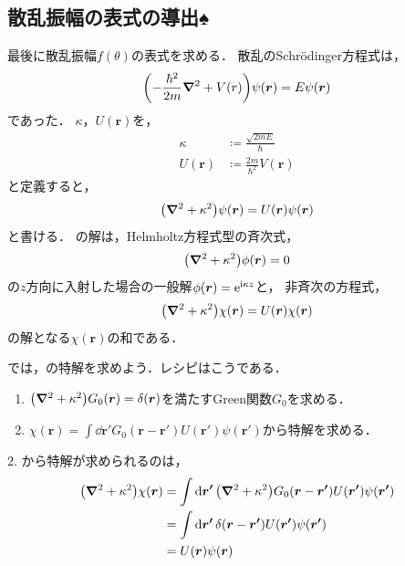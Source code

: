 \documentclass{report}
\begin{document}
  \subsection{散乱振幅の表式の導出♠}
    最後に散乱振幅$f(\theta)$の表式を求める．
    散乱のSchrödinger方程式は，
    \begin{align}
      \qty(-\frac{\hbar^2}{2m}\grad^2 + V(r))\psi(\bm{r}) = E\psi(\bm{r})
    \end{align}
    であった．
    $\kappa$，$U(\bm{r})$を，
    \begin{align}
      \kappa &\coloneqq \frac{\sqrt{2mE}}{\hbar} \label{kappa-def}\\
      U(\bm{r}) &\coloneqq \frac{2m}{\hbar^2} V(\bm{r})
    \end{align}
    と定義すると，
    \begin{align}
      \qty(\grad^2 + \kappa^2)\psi(\bm{r}) = U(\bm{r}) \psi(\bm{r}) \label{helmholtz-eq}
    \end{align}
    と書ける．
    の解は，Helmholtz方程式型の斉次式，
    \begin{align}
      \qty(\grad^2 + \kappa^2)\phi(\bm{r}) = 0
    \end{align}
    の$z$方向に入射した場合の一般解$\phi(\bm{r}) = \mathrm{e}^{\mathrm{i} \kappa z}$と，
    非斉次の方程式，
    \begin{align}
      \qty(\grad^2 + \kappa^2)\chi(\bm{r}) = U(\bm{r}) \chi(\bm{r})\label{particular-solution}
    \end{align}
    の解となる$\chi(\bm{r})$の和である．
    \par
    では，の特解を求めよう．レシピはこうである．
    \begin{enumerate}
      \item $\qty(\grad^2 + \kappa^2)G_0(\bm{r}) = \delta(\bm{r})$を満たすGreen関数$G_0$を求める．
      \item $\chi(\bm{r}) = \int\dd{\bm{r'}} G_0(\bm{r} - \bm{r'}) U(\bm{r'}) \psi(\bm{r'})$から特解を求める．
    \end{enumerate}
    2. から特解が求められるのは，
    \begin{align}
      \qty(\grad^2 + \kappa^2)\chi(\bm{r}) &= \int \dd{\bm{r'}}\qty(\grad^2 + \kappa^2)G_0(\bm{r} - \bm{r'}) U(\bm{r'}) \psi(\bm{r'}) \\
      &= \int\dd{\bm{r'}} \delta(\bm{r} - \bm{r'}) U(\bm{r'}) \psi(\bm{r'}) \\
      &= U(\bm{r}) \psi(\bm{r})
    \end{align}
\end{document}
